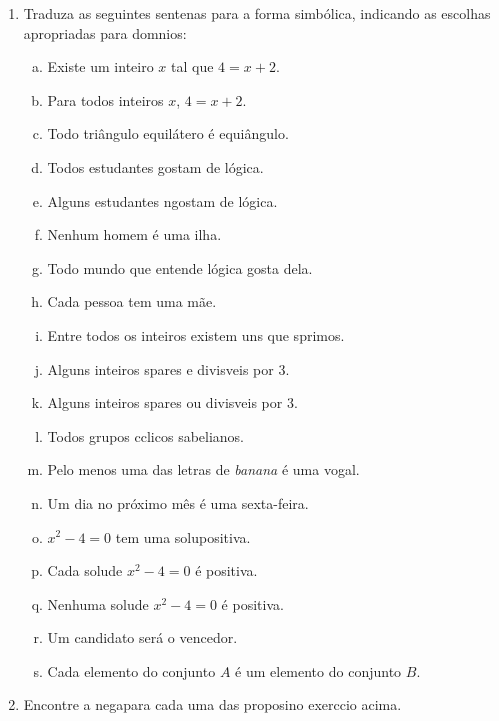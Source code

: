 \begin{enumerate}[{\bf 1.}]
\item Traduza as seguintes senten\cc as para a forma simb\'olica, indicando as escolhas apropriadas para dom\ih nios:
\begin{enumerate}[a)]
\item Existe um inteiro $x$ tal que $4=x+2$.
\item Para todos inteiros $x$, $4=x+2$.
\item Todo tri\^angulo equil\'atero \'e equi\^angulo.
\item Todos estudantes gostam de l\'ogica.
\item Alguns estudantes n\ao gostam de l\'ogica.
\item Nenhum homem \'e uma ilha.
\item Todo mundo que entende l\'ogica gosta dela.
\item Cada pessoa tem uma m\~ae.
\item Entre todos os inteiros existem uns que s\ao primos.
\item Alguns inteiros s\ao pares e divis\ih veis por 3.
\item Alguns inteiros s\ao pares ou divis\ih veis por 3.
\item Todos grupos c\ih clicos s\ao abelianos.
\item Pelo menos uma das letras de \emph{banana} \'e uma vogal.
\item Um dia no pr\'oximo m\^es \'e uma sexta-feira.
\item $x^2-4=0$ tem uma solu\cao positiva.
\item Cada solu\cao de $x^2-4=0$ \'e positiva.
\item Nenhuma solu\cao de $x^2-4=0$ \'e positiva.
\item Um candidato ser\'a o vencedor.
\item Cada elemento do conjunto $A$ \'e um elemento do conjunto $B$.
\end{enumerate}

\item Encontre a nega\cao para cada uma das proposi\coes no exerc\ih cio acima.


\end{enumerate}
